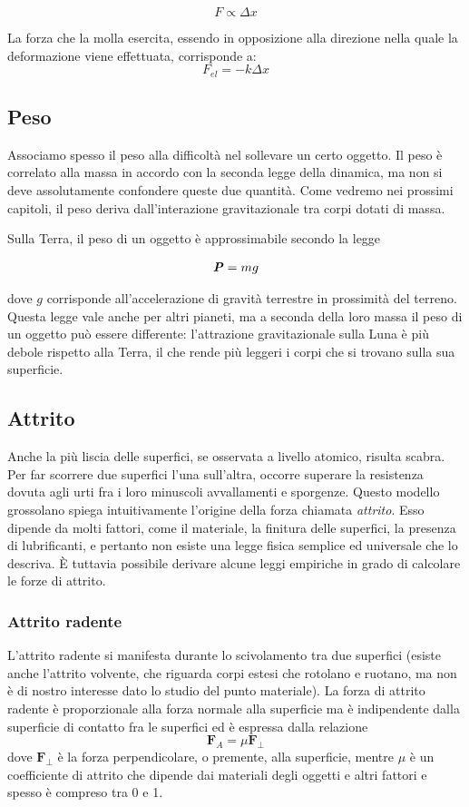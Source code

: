 \[ F \propto \Delta x \]

La forza che la molla esercita, essendo in opposizione alla direzione nella
quale la deformazione viene effettuata, corrisponde a:
\[ F_\textit{el} = -k\Delta x \]


\subsection{Peso}
Associamo spesso il peso alla difficoltà nel sollevare un certo oggetto.
Il peso è correlato alla massa in accordo con la seconda legge della
dinamica, ma non si deve assolutamente confondere queste due quantità.
Come vedremo nei prossimi capitoli, il peso deriva dall'interazione
gravitazionale tra corpi dotati di massa.

Sulla Terra, il peso di un oggetto è approssimabile secondo la legge

\begin{align}
    \textbf{\textit{P}} = mg
\end{align}

\noindent dove $g$ corrisponde all'accelerazione di gravità terrestre
in prossimità del terreno. Questa legge vale anche per altri pianeti,
ma a seconda della loro massa il peso di un oggetto può essere differente:
l'attrazione gravitazionale sulla Luna è più debole rispetto alla Terra,
il che rende più leggeri i corpi che si trovano sulla sua superficie.

\subsection{Attrito}
Anche la più liscia delle superfici, se osservata a livello atomico, risulta
scabra. Per far scorrere due superfici l'una sull'altra, occorre superare la
resistenza dovuta agli urti fra i loro minuscoli avvallamenti e sporgenze. Questo
modello grossolano spiega intuitivamente l'origine della forza chiamata
\textit{attrito}. Esso dipende da molti fattori, come il materiale, la finitura
delle superfici, la presenza di lubrificanti, e pertanto non esiste una legge
fisica semplice ed universale che lo descriva. È tuttavia possibile derivare
alcune leggi empiriche in grado di calcolare le forze di attrito.

\subsubsection*{Attrito radente}
L'attrito radente si manifesta durante lo scivolamento tra due superfici (esiste
anche l'attrito volvente, che riguarda corpi estesi che rotolano e ruotano, ma non
è di nostro interesse dato lo studio del punto materiale). La forza di attrito
radente è proporzionale alla forza normale alla superficie ma è indipendente dalla
superficie di contatto fra le superfici ed è espressa dalla relazione
\[ \textbf{F}_A = \mu\mathbf{F}_\perp \]
dove $\mathbf{F}_\perp$ è la forza perpendicolare, o premente, alla superficie,
mentre $\mu$ è un coefficiente di attrito che dipende dai materiali degli oggetti
e altri fattori e spesso è compreso tra 0 e 1.

